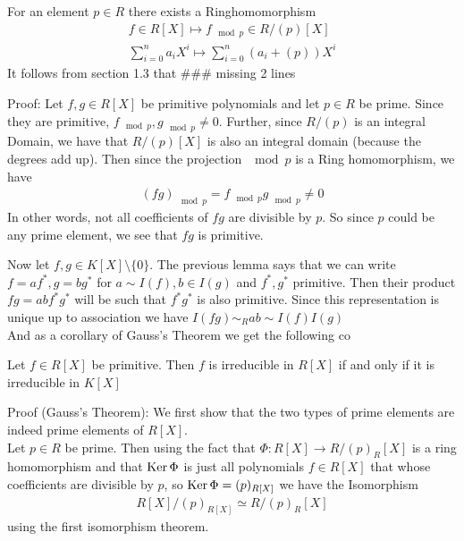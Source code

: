 For an element $p \in R$ there exists a Ringhomomorphism
\begin{align*}
	f \in R[X] \mapsto f_{\mod p} \in R/(p)[X]\\
	\sum_{i=0}^{n}a_iX^i \mapsto \sum_{i=0}^{n}(a_i + (p))X^i
\end{align*}
It follows from section 1.3 that \#\#\# missing 2 lines


Proof: Let $f,g \in R[X]$ be primitive polynomials and let $p \in R$ be prime. Since they are primitive, $f_{\mod p}, g_{\mod p} \neq 0$. Further, since $R/(p)$ is an integral Domain, we have that $R/(p)[X]$ is also an integral domain (because the degrees add up). Then since the projection $\mod p$ is a Ring homomorphism, we have
\begin{align*}
	(fg)_{\mod p} = f_{\mod p} g_{\mod p} \neq 0
\end{align*}
In other words, not all coefficients of $fg$ are divisible by $p$. So since $p$ could be any prime element, we see that $fg$ is primitive.

Now let $f,g \in K[X] \setminus \{0\}$. The previous lemma says that we can write $f = a f^*, g = b g^*$ for $a \sim I(f), b \in I(g)$ and $f^*, g^*$ primitive. Then their product $fg = ab f^*g^*$ will be such that $f^*g^*$ is also primitive. Since this representation is unique up to association we have $I(fg) \sim_R ab \sim I(f) I(g)$\\


And as a corollary of Gauss's Theorem we get the following co
\begin{corollary}[]
	Let $f \in R[X]$ be primitive. Then $f$ is irreducible in $R[X]$ if and only if it is irreducible in $K[X]$
\end{corollary}
Proof (Gauss's Theorem): We first show that the two types of prime elements are indeed prime elements of $R[X]$.\\
Let $p \in R$ be prime. Then using the fact that $\Phi: R[X] \to R/(p)_R[X]$ is a ring homomorphism and that $\operatorname{Ker} \Phi$ is just all polynomials $f \in R[X]$ that whose coefficients are divisible by $p$, so $\operatorname{Ker} \Phi = (p)_{R[X]}$ we have the Isomorphism
\begin{align*}
	R[X]/(p)_{R[X]} \simeq R/(p)_R[X]
\end{align*}
using the first isomorphism theorem.\\

